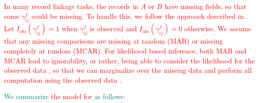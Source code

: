 \documentclass[ba]{imsart}
\begin{document}
\textcolor{red}{In many record linkage tasks, the records in $A$ or $B$ have missing fields, so that some $\gamma_{ij}^f$ could be missing.  To handle this, we follow the approach described in \cite{sadinle_bayesian_2017}.  Let $I_{obs}(\gamma_{ij}^f)=1$ when $\gamma_{ij}^f$ is observed and $I_{obs}(\gamma_{ij}^f)=0$ otherwise. We assume that any missing comparisons are missing at random (MAR) or missing completely at random (MCAR). For likelihood based inference, both MAR and MCAR lead to ignorability, or rather, being able to consider the likelihood for the observed data \citep[Section 6.2]{LittleRubin2002}, so that we can marginalize over the missing data and perform all computation using the observed data \citep{sadinle_detecting_2014, sadinle_bayesian_2017}.}





\textcolor{teal}{We summarize \textcolor{red}{the model for } as follows:} 
\end{document}
